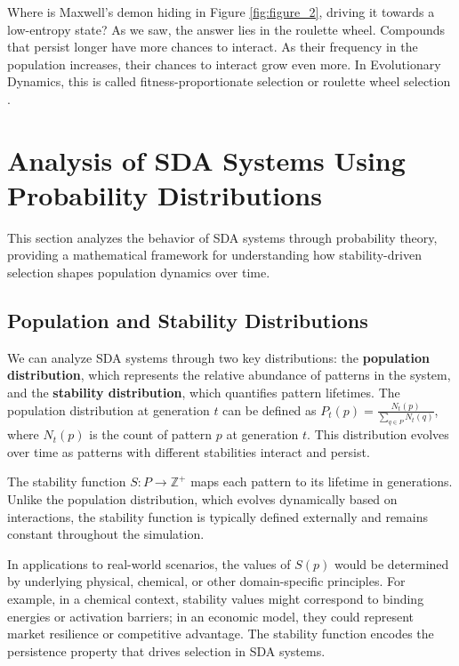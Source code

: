 \documentclass[preprint,12pt]{elsarticle}
\begin{document}
Where is Maxwell's demon \cite{leff2002maxwell} hiding in Figure \ref{fig:figure_2}, driving it towards a low-entropy state? As we saw, the answer lies in the roulette wheel. Compounds that persist longer have more chances to interact. As their frequency in the population increases, their chances to interact grow even more. In Evolutionary Dynamics, this is called fitness-proportionate selection \cite{back1996evolutionary} or roulette wheel selection \cite{goldberg1989genetic} \cite{holland1975adaptation}.


\section{Analysis of SDA Systems Using Probability Distributions}

This section analyzes the behavior of SDA systems through probability theory, providing a mathematical framework for understanding how stability-driven selection shapes population dynamics over time.

\subsection{Population and Stability Distributions}

We can analyze SDA systems through two key distributions: the \textbf{population distribution}, which represents the relative abundance of patterns in the system, and the \textbf{stability distribution}, which quantifies pattern lifetimes. The population distribution at generation \( t \) can be defined as \( P_t(p) = \frac{N_t(p)}{\sum_{q \in P} N_t(q)} \), where \( N_t(p) \) is the count of pattern \( p \) at generation \( t \). This distribution evolves over time as patterns with different stabilities interact and persist.

The stability function \( S: P \rightarrow \mathbb{Z}^{+} \) maps each pattern to its lifetime in generations. Unlike the population distribution, which evolves dynamically based on interactions, the stability function is typically defined externally and remains constant throughout the simulation.

In applications to real-world scenarios, the values of \(S(p)\) would be determined by underlying physical, chemical, or other domain-specific principles. For example, in a chemical context, stability values might correspond to binding energies or activation barriers; in an economic model, they could represent market resilience or competitive advantage. The stability function encodes the persistence property that drives selection in SDA systems.
\end{document}
